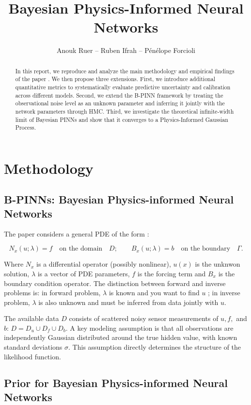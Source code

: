 \documentclass{article}
\title{Bayesian Physics-Informed Neural Networks}
\author{%
  Anouk Ruer -- Ruben Ifrah -- Pénélope Forcioli \\
}
\begin{document}
\maketitle

\begin{abstract}
In this report, we reproduce and analyze the main methodology and empirical findings of the paper \cite{Yang_2021}. We then propose three extensions. First, we introduce additional quantitative metrics to systematically evaluate predictive uncertainty and calibration across different models. Second, we extend the B-PINN framework by treating the observational noise level as an unknown parameter and inferring it jointly with the network parameters through HMC. Third, we investigate the theoretical infinite-width limit of Bayesian PINNs and show that it converges to a Physics-Informed Gaussian Process.
\end{abstract}


\section{Methodology}

\subsection{B-PINNs: Bayesian Physics-informed Neural Networks}
The paper considers a general PDE of the form : 

\[ N_x(u; \lambda) = f \quad \text{on the domain} \quad D ; \qquad
B_x(u; \lambda) = b \quad  \text{on the boundary} \quad \Gamma.
\]

Where $N_x$ is a differential operator (possibly nonlinear), $u(x)$ is the unknwon solution, $\lambda$ is a vector of PDE parameters, $f$ is the forcing term and $B_x$ is the boundary condition operator. The distinction between forward and inverse problems is: in forward problem, $\lambda$ is known and you want to find $u$ ; in inverse problem, $\lambda$ is also unknown and must be inferred from data jointly with $u$.

The available data $D$ consists of scattered noisy sensor measurements of $u, f,$ and $b$:
$D = D_u \cup D_f \cup D_b$.
A key modeling assumption is that all observations are independently Gaussian distributed around the true hidden value, with known standard deviations $\sigma$. This assumption directly determines the structure of the likelihood function.

\subsection{Prior for Bayesian Physics-informed Neural Networks}
\end{document}
